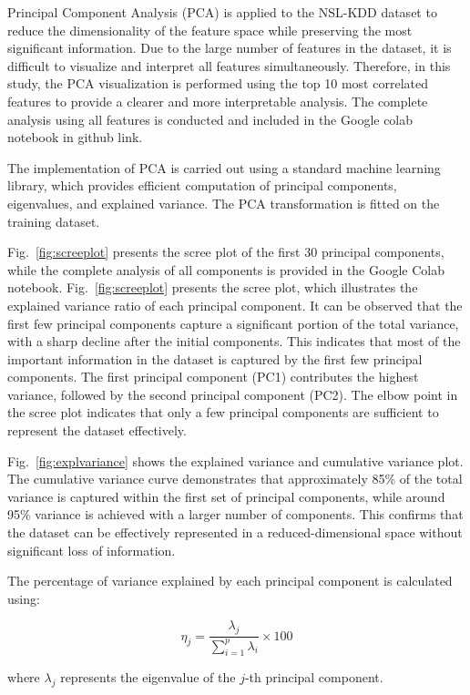 \documentclass[conference]{IEEEtran}
\begin{document}
Principal Component Analysis (PCA) is applied to the NSL-KDD dataset to reduce the dimensionality of the feature space while preserving the most significant information. Due to the large number of features in the dataset, it is difficult to visualize and interpret all features simultaneously. Therefore, in this study, the PCA visualization is performed using the top 10 most correlated features to provide a clearer and more interpretable analysis. The complete analysis using all features is conducted and included in the Google colab notebook in github link.

The implementation of PCA is carried out using a standard machine learning library, which provides efficient computation of principal components, eigenvalues, and explained variance. The PCA transformation is fitted on the training dataset.

Fig.~\ref{fig:screeplot} presents the scree plot of the first 30 principal components, while the complete analysis of all components is provided in the Google Colab notebook.
Fig.~\ref{fig:screeplot} presents the scree plot, which illustrates the explained variance ratio of each principal component. It can be observed that the first few principal components capture a significant portion of the total variance, with a sharp decline after the initial components. This indicates that most of the important information in the dataset is captured by the first few principal components. The first principal component (PC1) contributes the highest variance, followed by the second principal component (PC2). The elbow point in the scree plot indicates that only a few principal components are sufficient to represent the dataset effectively.

Fig.~\ref{fig:explvariance} shows the explained variance and cumulative variance plot. The cumulative variance curve demonstrates that approximately 85\% of the total variance is captured within the first set of principal components, while around 95\% variance is achieved with a larger number of components. This confirms that the dataset can be effectively represented in a reduced-dimensional space without significant loss of information.

The percentage of variance explained by each principal component is calculated using:

\begin{equation}
\eta_j = \frac{\lambda_j}{\sum_{i=1}^{p} \lambda_i} \times 100
\end{equation}

where $\lambda_j$ represents the eigenvalue of the $j$-th principal component. 
\end{document}
